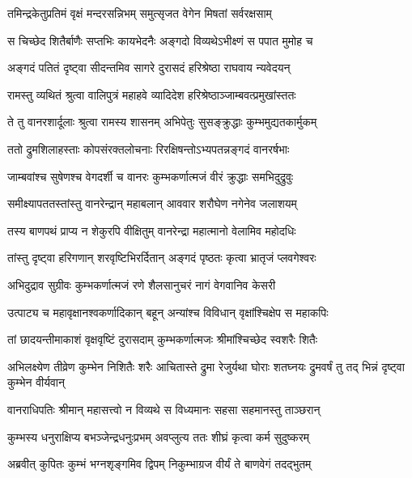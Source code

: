 \twolineshloka
{तमिन्द्रकेतुप्रतिमं वृक्षं मन्दरसन्निभम्}
{समुत्सृजत वेगेन मिषतां सर्वरक्षसाम्} %

\twolineshloka
{स चिच्छेद शितैर्बाणैः सप्तभिः कायभेदनैः}
{अङ्गदो विव्यथेऽभीक्ष्णं स पपात मुमोह च} %

\twolineshloka
{अङ्गदं पतितं दृष्ट्वा सीदन्तमिव सागरे}
{दुरासदं हरिश्रेष्ठा राघवाय न्यवेदयन्} %

\twolineshloka
{रामस्तु व्यथितं श्रुत्वा वालिपुत्रं महाहवे}
{व्यादिदेश हरिश्रेष्ठाञ्जाम्बवत्प्रमुखांस्ततः} %

\twolineshloka
{ते तु वानरशार्दूलाः श्रुत्वा रामस्य शासनम्}
{अभिपेतुः सुसङ्क्रुद्धाः कुम्भमुद्यतकार्मुकम्} %

\twolineshloka
{ततो द्रुमशिलाहस्ताः कोपसंरक्तलोचनाः}
{रिरक्षिषन्तोऽभ्यपतन्नङ्गदं वानरर्षभाः} %

\twolineshloka
{जाम्बवांश्च सुषेणश्च वेगदर्शी च वानरः}
{कुम्भकर्णात्मजं वीरं क्रुद्धाः समभिदुद्रुवुः} %

\twolineshloka
{समीक्ष्यापततस्तांस्तु वानरेन्द्रान् महाबलान्}
{आववार शरौघेण नगेनेव जलाशयम्} %

\twolineshloka
{तस्य बाणपथं प्राप्य न शेकुरपि वीक्षितुम्}
{वानरेन्द्रा महात्मानो वेलामिव महोदधिः} %

\twolineshloka
{तांस्तु दृष्ट्वा हरिगणान् शरवृष्टिभिरर्दितान्}
{अङ्गदं पृष्ठतः कृत्वा भ्रातृजं प्लवगेश्वरः} %

\twolineshloka
{अभिदुद्राव सुग्रीवः कुम्भकर्णात्मजं रणे}
{शैलसानुचरं नागं वेगवानिव केसरी} %

\twolineshloka
{उत्पाट्य च महावृक्षानश्वकर्णादिकान् बहून्}
{अन्यांश्च विविधान् वृक्षांश्चिक्षेप स महाकपिः} %

\twolineshloka
{तां छादयन्तीमाकाशं वृक्षवृष्टिं दुरासदाम्}
{कुम्भकर्णात्मजः श्रीमांश्चिच्छेद स्वशरैः शितैः} %

\threelineshloka
{अभिलक्ष्येण तीव्रेण कुम्भेन निशितैः शरैः}
{आचितास्ते द्रुमा रेजुर्यथा घोराः शतघ्नयः}
{द्रुमवर्षं तु तद् भिन्नं दृष्ट्वा कुम्भेन वीर्यवान्} %

\twolineshloka
{वानराधिपतिः श्रीमान् महासत्त्वो न विव्यथे}
{स विध्यमानः सहसा सहमानस्तु ताञ्छरान्} %

\twolineshloka
{कुम्भस्य धनुराक्षिप्य बभञ्जेन्द्रधनुःप्रभम्}
{अवप्लुत्य ततः शीघ्रं कृत्वा कर्म सुदुष्करम्} %

\twolineshloka
{अब्रवीत् कुपितः कुम्भं भग्नशृङ्गमिव द्विपम्}
{निकुम्भाग्रज वीर्यं ते बाणवेगं तदद्भुतम्} %


